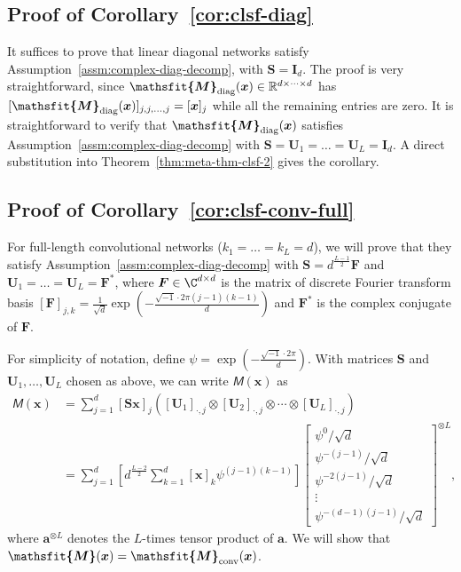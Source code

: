 \documentclass{article} %
\def\va{{\bm{a}}}
\def\vx{{\bm{x}}}
\def\mF{{\bm{F}}}
\def\mI{{\bm{I}}}
\def\mS{{\bm{S}}}
\def\mU{{\bm{U}}}
\newcommand{\tens}[1]{\bm{\mathsfit{#1}}}
\def\tM{{\tens{M}}}
\newcommand{\R}{\mathbb{R}}
\newcommand{\tMdiag}{\tM_{\rm diag}}
\newcommand{\tMconv}{\tM_{\rm conv}}
\begin{document}
\subsection{Proof of Corollary~\ref{cor:clsf-diag}}
\label{sec:proof-cor-clsf-diag}
It suffices to prove that linear diagonal networks satisfy Assumption~\ref{assm:complex-diag-decomp}, with $\mS = \mI_d$.
The proof is very straightforward, since $\tMdiag(\vx) \in \R^{d \times \cdots \times d}$ has $[\tMdiag(\vx)]_{j,j,\dots,j} = [\vx]_j$ while all the remaining entries are zero. It is straightforward to verify that $\tMdiag(\vx)$ satisfies Assumption~\ref{assm:complex-diag-decomp} with $\mS = \mU_1 = \dots = \mU_L = \mI_d$.
A direct substitution into Theorem~\ref{thm:meta-thm-clsf-2} gives the corollary. 


\subsection{Proof of Corollary~\ref{cor:clsf-conv-full}}
\label{sec:proof-cor-clsf-conv-full}
For full-length convolutional networks ($k_1 = \dots = k_L = d$), we will prove that they satisfy Assumption~\ref{assm:complex-diag-decomp} with
$\mS = d^{\frac{L-1}{2}} \mF$ and $\mU_1 = \dots = \mU_L = \mF^*$, where $\mF \in \C^{d \times d}$ is the matrix of discrete Fourier transform basis $[\mF]_{j,k} = \frac{1}{\sqrt{d}} \exp(-\frac{\sqrt{-1} \cdot 2 \pi (j-1)(k-1)}{d})$ and $\mF^*$ is the complex conjugate of $\mF$.

For simplicity of notation, define $\psi=\exp(-\frac{\sqrt{-1}\cdot2\pi}{d})$.
With matrices $\mS$ and $\mU_1, \dots, \mU_L$ chosen as above, we can write $\tM(\vx)$ as
\begin{align*}
    \tM(\vx) &= \sum_{j=1}^d [\mS \vx]_j ([\mU_1]_{\cdot,j} \otimes [\mU_2]_{\cdot,j} \otimes \cdots \otimes [\mU_L]_{\cdot,j})\\
    &= \sum_{j=1}^d \left [d^{\frac{L-2}{2}} \sum_{k=1}^d [\vx]_k \psi^{(j-1)(k-1)} \right] 
    \begin{bmatrix}
    \psi^0 / \sqrt{d} \\ \psi^{-(j-1)} / \sqrt{d} \\ \psi^{-2(j-1)} / \sqrt{d} \\ \vdots \\ \psi^{-(d-1)(j-1)} / \sqrt{d}
    \end{bmatrix}^{\otimes L},
\end{align*}
where $\va^{\otimes L}$ denotes the $L$-times tensor product of $\va$.
We will show that $\tM(\vx) = \tMconv(\vx)$.
\end{document}
